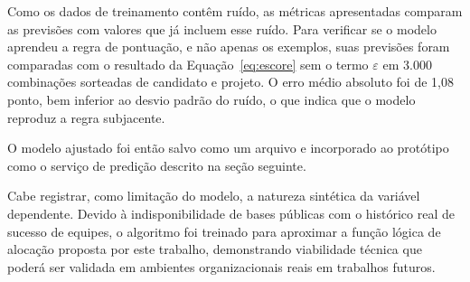 Como os dados de treinamento contêm ruído, as métricas apresentadas comparam as previsões com valores que já incluem esse ruído. Para verificar se o modelo aprendeu a regra de pontuação, e não apenas os exemplos, suas previsões foram comparadas com o resultado da Equação~\ref{eq:escore} sem o termo $\varepsilon$ em 3.000 combinações sorteadas de candidato e projeto. O erro médio absoluto foi de 1,08 ponto, bem inferior ao desvio padrão do ruído, o que indica que o modelo reproduz a regra subjacente.

O modelo ajustado foi então salvo como um arquivo e incorporado ao protótipo como o serviço de predição descrito na seção seguinte.

Cabe registrar, como limitação do modelo, a natureza sintética da variável dependente. Devido à indisponibilidade de bases públicas com o histórico real de sucesso de equipes, o algoritmo foi treinado para aproximar a função lógica de alocação proposta por este trabalho, demonstrando viabilidade técnica que poderá ser validada em ambientes organizacionais reais em trabalhos futuros.
